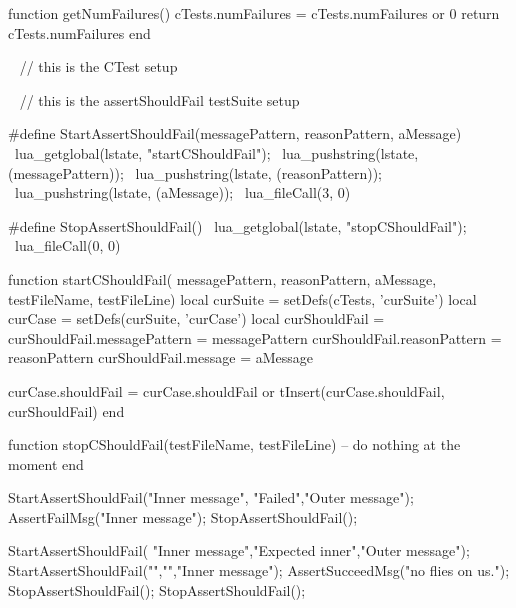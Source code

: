 function getNumFailures()
  cTests.numFailures = cTests.numFailures or 0
  return cTests.numFailures
end
\stopLuaCode

\CTestsSetup\
\startCTest
  // this is the CTest setup
\stopCTest


\CTestsSuiteSetup\
\startCTest
  // this is the assertShouldFail testSuite setup
\stopCTest

\startCHeader
#define StartAssertShouldFail(messagePattern, reasonPattern, aMessage) \
  lua_getglobal(lstate, "startCShouldFail");                           \
  lua_pushstring(lstate, (messagePattern));                            \
  lua_pushstring(lstate, (reasonPattern));                             \
  lua_pushstring(lstate, (aMessage));                                  \
  lua_fileCall(3, 0)

#define StopAssertShouldFail()              \
  lua_getglobal(lstate, "stopCShouldFail"); \
  lua_fileCall(0, 0)
\stopCHeader

\startLuaCode
function startCShouldFail(
  messagePattern, reasonPattern, aMessage,
  testFileName, testFileLine)
  local curSuite     = setDefs(cTests, 'curSuite')
  local curCase      = setDefs(curSuite, 'curCase')
  local curShouldFail   = { }
  curShouldFail.messagePattern = messagePattern
  curShouldFail.reasonPattern  = reasonPattern
  curShouldFail.message        = aMessage
  
  curCase.shouldFail = curCase.shouldFail or { }
  tInsert(curCase.shouldFail, curShouldFail)
end

function stopCShouldFail(testFileName, testFileLine)
  -- do nothing at the moment
end
\stopLuaCode


\startCTest
StartAssertShouldFail("Inner message", "Failed","Outer message");
  AssertFailMsg("Inner message");
StopAssertShouldFail();
\stopCTest
\stopTestCase


\startCTest
StartAssertShouldFail(
  "Inner message","Expected inner","Outer message");
  StartAssertShouldFail("","","Inner message");
    AssertSucceedMsg("no flies on us.");
  StopAssertShouldFail();
StopAssertShouldFail();
\stopCTest
\stopTestCase


